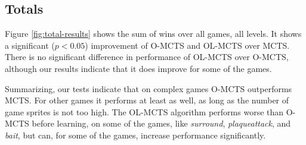 \subsection{Totals}
\label{subsec:totals}
Figure \ref{fig:total-results} shows the sum of wins over all games, all levels.
It shows a significant ($p < 0.05$) improvement of O-MCTS and OL-MCTS over MCTS.
There is no significant difference in performance of OL-MCTS over O-MCTS,
although our results indicate that it does improve for some of the games.

Summarizing, our tests indicate that on complex games O-MCTS outperforms MCTS.
For other games it performs at least as well, as long as the number of game
sprites is not too high. 
The OL-MCTS algorithm performs worse than O-MCTS before learning, on some of the
games, like \textit{surround}, \textit{plaqueattack}, and \textit{bait}, but
can, for some of the games, increase performance significantly.
